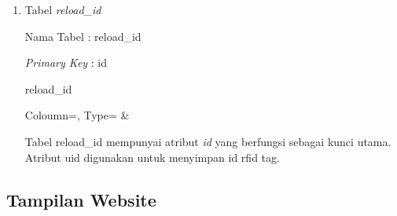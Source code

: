 \begin{enumerate}[topsep=0pt,itemsep=0pt,partopsep=0pt, parsep=0pt]
    \item Tabel \textit{reload\_id}

    Nama Tabel : reload\_id

    \textit{Primary Key} : id

    \begin{table} [H]
        \centering
        \caption{reload\_id}
        \label{table:db_reload_id}
            {
                Coloumn=\Coloumn, 
                Type=\Type}
            {
                \Coloumn & 
                \Type}
    \end{table}

    Tabel reload\_id mempunyai atribut \textit{id} yang berfungsi sebagai kunci utama. Atribut uid digunakan untuk menyimpan id rfid tag.

\end{enumerate}

\subsection{Tampilan Website}